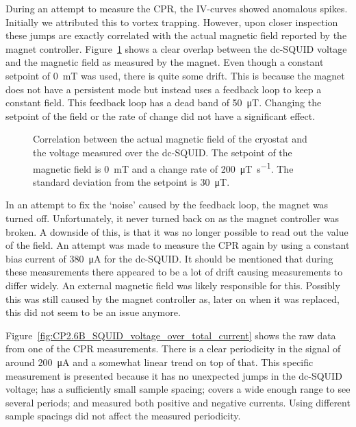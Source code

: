 During an attempt to measure the CPR, the IV-curves showed anomalous spikes. Initially we attributed this to vortex trapping. However, upon closer inspection these jumps are exactly correlated with the actual magnetic field reported by the magnet controller. Figure~\ref{fig:CP2.6B_PPMS_magnetic_field_drift} shows a clear overlap between the dc-SQUID voltage and the magnetic field as measured by the magnet. Even though a constant setpoint of \qty{0}{\milli\tesla} was used, there is quite some drift. This is because the magnet does not have a persistent mode but instead uses a feedback loop to keep a constant field. This feedback loop has a dead band of \qty{50}{\micro\tesla}. Changing the setpoint of the field or the rate of change did not have a significant effect.

\begin{figure}[ht!]
	\centering
	
	\caption{Correlation between the actual magnetic field of the cryostat and the voltage measured over the dc-SQUID. The setpoint of the magnetic field is \qty{0}{\milli\tesla} and a change rate of \qty{200}{\micro\tesla\per\second}. The standard deviation from the setpoint is \qty{30}{\micro\tesla}.}
	\label{fig:CP2.6B_PPMS_magnetic_field_drift}
\end{figure}

In an attempt to fix the `noise' caused by the feedback loop, the magnet was turned off. Unfortunately, it never turned back on as the magnet controller was broken. A downside of this, is that it was no longer possible to read out the value of the field. An attempt was made to measure the CPR again by using a constant bias current of \qty{380}{\micro\ampere} for the dc-SQUID. It should be mentioned that during these measurements there appeared to be a lot of drift causing measurements to differ widely. An external magnetic field was likely responsible for this. Possibly this was still caused by the magnet controller as, later on when it was replaced, this did not seem to be an issue anymore.

Figure~\ref{fig:CP2.6B_SQUID_voltage_over_total_current} shows the raw data from one of the CPR measurements. There is a clear periodicity in the signal of around \qty{200}{\micro\ampere} and a somewhat linear trend on top of that. This specific measurement is presented because it has no unexpected jumps in the dc-SQUID voltage; has a sufficiently small sample spacing; covers a wide enough range to see several periods; and measured both positive and negative currents. Using different sample spacings did not affect the measured periodicity.

